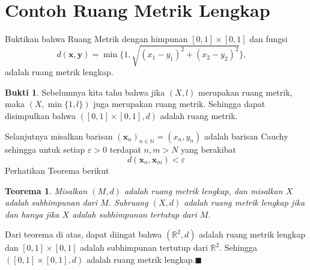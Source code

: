 \documentclass[a4paper]{article}
\newtheorem*{teorema}{Teorema}
\theoremstyle{definition}
\newtheorem*{bukti}{Bukti}
\newcommand{\R}{\mathbb{R}}
\newcommand{\N}{\mathbb{N}}
\begin{document}
\pagestyle{fancy}
\section*{Contoh Ruang Metrik Lengkap}
\noindent Buktikan bahwa Ruang Metrik dengan himpunan $[0,1]\times[0,1]$ dan fungsi 
\[d(\mathbf{x},\mathbf{y})=\min\{1,\sqrt{(x_1-y_1)^2+(x_2-y_2)^2}\},\quad \] 
adalah ruang metrik lengkap.
\begin{bukti}
  Sebelumnya kita tahu bahwa jika $(X,l)$ merupakan ruang metrik, maka $(X,\min\{1,l\})$ juga merupakan ruang metrik. Sehingga dapat disimpulkan bahwa $([0,1]\times[0,1],d)$ adalah ruang metrik. 
  
  Selanjutnya misalkan barisan $(\mathbf{x}_n)_{n\in\N}=(x_n,y_n)$ adalah barisan Cauchy sehingga untuk setiap $\varepsilon>0$ terdapat $n,m>N$ yang berakibat
  \[d(\mathbf{x}_n,\mathbf{x}_m)<\varepsilon\]
  Perhatikan Teorema berikut
  \begin{teorema}
    Misalkan $(M, d)$ adalah ruang metrik lengkap, dan misalkan $X$ adalah subhimpunan dari $M$. Subruang $(X, d)$ adalah ruang metrik lengkap jika dan hanya jika $X$ adalah subhimpunan tertutup dari $M$.
  \end{teorema}
  Dari teorema di atas, dapat diingat bahwa $(\R^2,d)$ adalah ruang metrik lengkap dan $[0,1]\times[0,1]$ adalah subhimpunan tertutup dari $\R^2$. Sehingga $([0,1]\times[0,1],d)$ adalah ruang metrik lengkap.$\blacksquare$
\end{bukti} 
\end{document}
